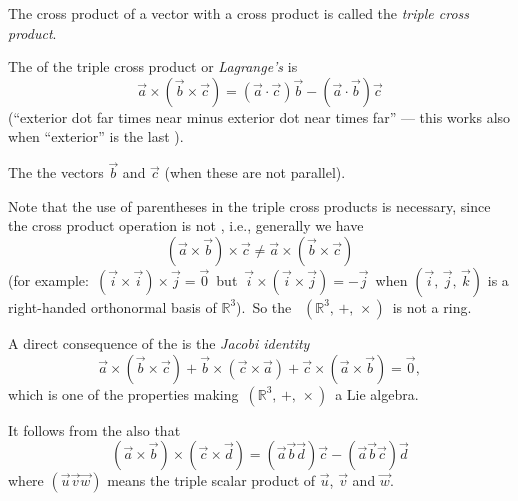 \documentclass[12pt]{article}
\begin{document}
The cross product of a vector with a cross product is called the {\em triple cross product}.

The  of the triple cross product or {\em Lagrange's } is
  $$\vec{a} \times (\vec{b} \times \vec{c}) = (\vec{a} \cdot    \vec{c})\vec{b}-(\vec{a} \cdot \vec{b})\vec{c}$$
(``exterior dot far times near minus exterior dot near times far'' --- this works also when ``exterior'' is the last ).

The  the vectors $\vec{b}$ and $\vec{c}$ (when these are not parallel).

Note that the use of parentheses in the triple cross products is necessary, since the cross product operation is not , i.e., generally we have
  $$(\vec{a}\times\vec{b})\times\vec{c} \neq\vec{a}\times(\vec{b}\times\vec{c})$$
(for example:\, $(\vec{i}\times\vec{i})\times\vec{j} = \vec{0}$\, but\, $\vec{i}\times(\vec{i}\times\vec{j}) = -\vec{j}$\, when 
$(\vec{i},\,\vec{j},\,\vec{k})$ is a right-handed orthonormal basis of $\mathbb{R}^3$).\, So the \, $(\mathbb{R}^3,\,+,\,\times)$\, is not a ring.

A direct consequence of the  is the {\em Jacobi identity}
$$\vec{a}\times(\vec{b}\times\vec{c})+\vec{b}\times(\vec{c}\times\vec{a})+
  \vec{c} \times(\vec{a}\times\vec{b}) = \vec{0},$$
which is one of the properties making\, $(\mathbb{R}^3,\,+,\,\times)$\, a Lie algebra.

It follows from the  also that
  $$(\vec{a}\times\vec{b})\times(\vec{c}\times\vec{d}) = (\vec{a}\vec{b}\vec{d})\vec{c}-(\vec{a}\vec{b}\vec{c})\vec{d}$$
where $(\vec{u}\vec{v}\vec{w})$ means the triple scalar product of $\vec{u}$, $\vec{v}$ and $\vec{w}$.
\end{document}
